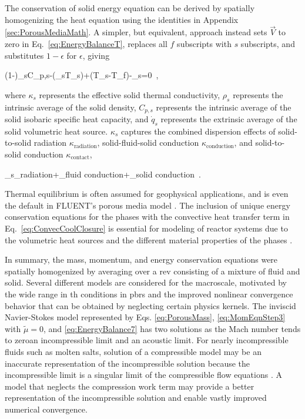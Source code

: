 The conservation of solid energy equation can be derived by spatially homogenizing the heat equation using the identities in Appendix \ref{sec:PorousMediaMath}. A simpler, but equivalent, approach instead sets \(\vec{V}\) to zero in Eq.\ \eqref{eq:EnergyBalanceT}, replaces all \(f\) subscripts with \(s\) subscripts, and substitutes \(1-\epsilon\) for \(\epsilon\), giving

\beq
\label{eq:SolidPorous}
(1-\epsilon)\rho_sC_{p,s}-\nabla\cdot(\kappa_s\nabla T_s)+\alpha(T_s-T_f)-_s=0\ ,
\eeq

\noindent where \(\kappa_s\) represents the effective solid thermal conductivity, \(\rho_s\) represents the intrinsic average of the solid density, \(C_{p,s}\) represents the intrinsic average of the solid isobaric specific heat capacity, and \(\dot{q}_s\) represents the extrinsic average of the solid volumetric heat source. \(\kappa_s\) captures the combined dispersion effects of solid-to-solid radiation \(\kappa_\text{radiation}\), solid-fluid-solid conduction \(\kappa_\text{conduction}\), and solid-to-solid conduction \(\kappa_\text{contact}\),

\beq
\label{eq:Kappa}
\kappa_s\equiv\kappa_{\textrm{radiation}}+\kappa_{\textrm{fluid conduction}}+\kappa_{\textrm{solid conduction}}\ .
\eeq

\noindent Thermal equilibrium is often assumed for geophysical applications, and is even the default in FLUENT's porous media model \cite{fluent}. The inclusion of unique energy conservation equations for the phases with the convective heat transfer term in Eq.\ \eqref{eq:ConvecCoolClosure} is essential for modeling of reactor systems due to the volumetric heat sources and the different material properties of the phases \cite{becker,novak_sana}.

In summary, the mass, momentum, and energy conservation equations were spatially homogenized by averaging over a \gls{rev} consisting of a mixture of fluid and solid. Several different models are considered for the macroscale, motivated by the wide range in \gls{th} conditions in \glspl{pbr} and the improved nonlinear convergence behavior that can be obtained by neglecting certain physics kernels. The inviscid Navier-Stokes model represented by Eqs. \eqref{eq:PorousMass}, \eqref{eq:MomEqnStep3} with \(\tilde{\mu}=0\), and \eqref{eq:EnergyBalance7} has two solutions as the Mach number tends to zero\mdash an incompressible limit and an acoustic limit. For nearly incompressible fluids such as molten salts, solution of a compressible model may be an inaccurate representation of the incompressible solution because the incompressible limit is a singular limit of the compressible flow equations \cite{guillard}. A model that neglects the compression work term may provide a better representation of the incompressible solution and enable vastly improved numerical convergence.

